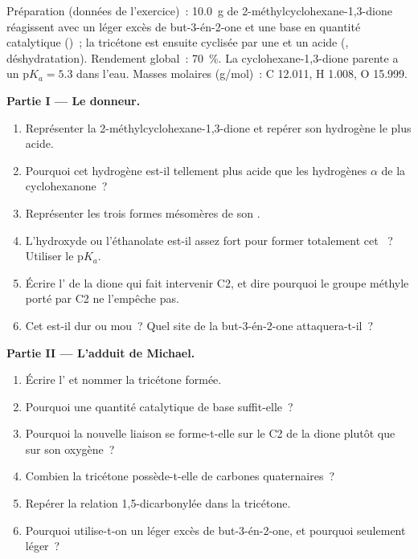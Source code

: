 \begin{problem}
\label{pb:b2:conjugate-additions:1}
Préparation (données de l'exercice)~: \qty{10.0}{g} de 2-méthylcyclohexane-1,3-dione réagissent avec
un léger excès de but-3-én-2-one et une base en quantité catalytique ()~; la
tricétone est ensuite cyclisée par une  et un acide (, déshydratation).
Rendement global~: 70~\%. La cyclohexane-1,3-dione parente a un
$\mathrm pK_a = 5.3$ dans l'eau. Masses molaires (\unit{g/mol})~: C 12.011, H 1.008, O 15.999.

\medskip
\noindent\textbf{Partie I --- Le donneur.}
\begin{enumerate}
  \item Représenter la 2-méthylcyclohexane-1,3-dione et repérer son hydrogène le plus acide.
  \item Pourquoi cet hydrogène est-il tellement plus acide que les hydrogènes $\alpha$ de la cyclohexanone~?
  \item Représenter les trois formes mésomères de son .
  \item L'hydroxyde ou l'éthanolate est-il assez fort pour former totalement cet ~? Utiliser le $\mathrm pK_a$.
  \item Écrire l' de la dione qui fait intervenir C2, et dire pourquoi le groupe méthyle porté par C2
        ne l'empêche pas.
  \item Cet  est-il dur ou mou~? Quel site de la but-3-én-2-one attaquera-t-il~?
\end{enumerate}

\medskip
\noindent\textbf{Partie II --- L'adduit de Michael.}
\begin{enumerate}[resume]
  \item Écrire l' et nommer la tricétone formée.
  \item Pourquoi une quantité catalytique de base suffit-elle~?
  \item Pourquoi la nouvelle liaison se forme-t-elle sur le C2 de la dione plutôt que sur son oxygène~?
  \item Combien la tricétone possède-t-elle de carbones quaternaires~?
  \item Repérer la relation 1,5-dicarbonylée dans la tricétone.
  \item Pourquoi utilise-t-on un léger excès de but-3-én-2-one, et pourquoi seulement léger~?
\end{enumerate}


\end{problem}
